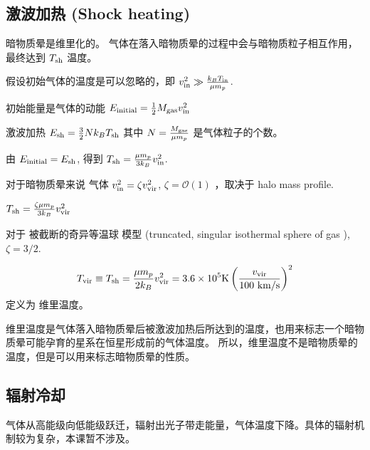 \documentclass[12pt]{ctexart}
\begin{document}
\subsection{激波加热 (Shock heating)}

暗物质晕是维里化的。
气体在落入暗物质晕的过程中会与暗物质粒子相互作用，最终达到 $T _{\rm{sh}} $  温度。

假设初始气体的温度是可以忽略的，即 $v _{\rm{in}} ^2 \gg \frac{k_B T _{\rm{in}} }{\mu m_p}$.

初始能量是气体的动能 $E _{\rm{initial}} = \frac{1}{2} M _{\rm{gas}} v _{\rm{in}} ^2$

激波加热 $E _{\rm{sh}} = \frac{3}{2} N k_B T _{\rm{sh}} $
其中  $N=\frac{M _{\rm{gas}} }{\mu m_p}$ 是气体粒子的个数。

由 $E _{\rm{initial}} = E _{\rm{sh}} $,
得到 
$T _{\rm{sh}} =\frac{\mu m_p}{3k_B} v _{\rm{in}} ^2$.

对于暗物质晕来说 气体 $v _{\rm{in}} ^2 = \zeta v _{\rm{vir}} ^2$, $\zeta = \mathcal{O} (1)$ ，取决于 halo mass profile.

$T _{\rm{sh}} =\frac{\zeta \mu m_p}{3k_B} v _{\rm{vir}} ^2$


对于 被截断的奇异等温球 模型 (truncated, singular isothermal sphere of gas ),
$\zeta = 3/2$.

\begin{equation}
    T _{\rm{vir}} \equiv T _{\rm{sh}} = \frac{\mu m_p}{2k_B} v_{\rm{vir}} ^2 = 3.6\times 10^5 \mathrm{K} \left(\frac{ v_{\rm{vir}} }{100 \mathrm{~km/s}} \right) ^2
\end{equation}
定义为 维里温度。

维里温度是气体落入暗物质晕后被激波加热后所达到的温度，也用来标志一个暗物质晕可能孕育的星系在恒星形成前的气体温度。
所以，维里温度不是暗物质晕的温度，但是可以用来标志暗物质晕的性质。

\subsection{辐射冷却}

气体从高能级向低能级跃迁，辐射出光子带走能量，气体温度下降。具体的辐射机制较为复杂，本课暂不涉及。
\end{document}
